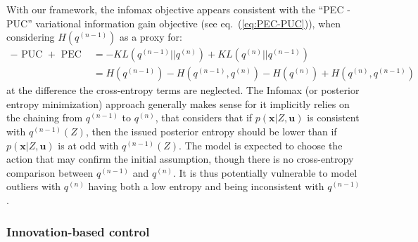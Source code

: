 \documentclass[12pt,twoside,openright]{article}
\begin{document}
With our framework, the infomax objective appears consistent with the ``PEC - PUC'' variational information gain objective (see eq.~(\ref{eq:PEC-PUC})),  
when considering $H(q^{(n-1)})$ as a proxy for: 
\begin{align*}
-\text{ PUC } + \text{ PEC } &= -KL(q^{(n-1)}||q^{(n)})  + KL(q^{(n)}||q^{(n-1)})\\
&=  H(q^{(n-1)}) - H(q^{(n-1)}, q^{(n)}) - H(q^{(n)}) + H(q^{(n)}, q^{(n-1)})
\end{align*}
at the difference the cross-entropy terms are neglected. The Infomax (or posterior entropy minimization) approach generally makes sense for it implicitly relies on the chaining from $q^{(n-1)}$ to $q^{(n)}$, that considers that if $p(\boldsymbol{x}|Z, \boldsymbol{u})$ is consistent with $q^{(n-1)}(Z)$, then the issued posterior entropy should be lower than if $p(\boldsymbol{x}|Z, \boldsymbol{u})$ is at odd with $q^{(n-1)}(Z)$. The model is expected to choose the action that may confirm the initial assumption, though there is no cross-entropy comparison between $q^{(n-1)}$ and $q^{(n)}$.
It is thus potentially vulnerable to model outliers with $q^{(n)}$ having both a low entropy and being inconsistent with $q^{(n-1)}$. 


\subsubsection{Innovation-based control}\label{sec:saliency}


\end{document}
